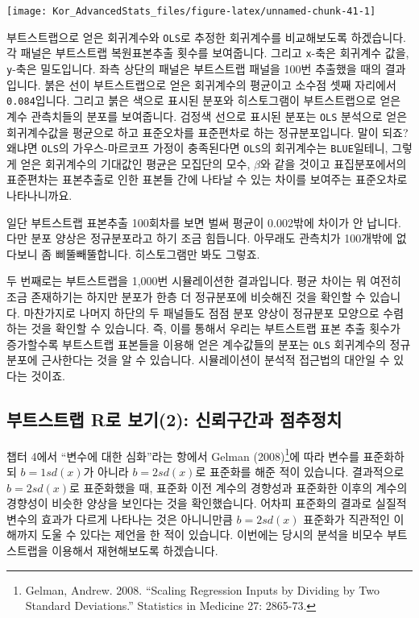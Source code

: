 \documentclass[
]{book}
\begin{document}
\begin{center}\texttt{[image: Kor\_AdvancedStats\_files/figure-latex/unnamed-chunk-41-1]} \end{center}

부트스트랩으로 얻은 회귀계수와 \texttt{OLS}로 추정한 회귀계수를 비교해보도록 하겠습니다. 각 패널은 부트스트랩 복원표본추출 횟수를 보여줍니다. 그리고 \texttt{x}-축은 회귀계수 값을, \texttt{y}-축은 밀도입니다. 좌측 상단의 패널은 부트스트랩 패널을 100번 추출했을 때의 결과입니다. 붉은 선이 부트스트랩으로 얻은 회귀계수의 평균이고 소수점 셋째 자리에서 \texttt{0.084}입니다. 그리고 붉은 색으로 표시된 분포와 히스토그램이 부트스트랩으로 얻은 계수 관측치들의 분포를 보여줍니다. 검정색 선으로 표시된 분포는 \texttt{OLS} 분석으로 얻은 회귀계수값을 평균으로 하고 표준오차를 표준편차로 하는 정규분포입니다. 말이 되죠? 왜냐면 \texttt{OLS}의 가우스-마르코프 가정이 충족된다면 \texttt{OLS}의 회귀계수는 \texttt{BLUE}일테니, 그렇게 얻은 회귀계수의 기대값인 평균은 모집단의 모수, \(\beta\)와 같을 것이고 표집분포에서의 표준편차는 표본추출로 인한 표본들 간에 나타날 수 있는 차이를 보여주는 표준오차로 나타나니까요.

일단 부트스트랩 표본추출 100회차를 보면 벌써 평균이 0.002밖에 차이가 안 납니다. 다만 분포 양상은 정규분포라고 하기 조금 힘듭니다. 아무래도 관측치가 100개밖에 없다보니 좀 삐뚤빼뚤합니다. 히스토그램만 봐도 그렇죠.

두 번째로는 부트스트랩을 1,000번 시뮬레이션한 결과입니다. 평균 차이는 뭐 여전히 조금 존재하기는 하지만 분포가 한층 더 정규분포에 비슷해진 것을 확인할 수 있습니다. 마찬가지로 나머지 하단의 두 패널들도 점점 분포 양상이 정규분포 모양으로 수렴하는 것을 확인할 수 있습니다. 즉, 이를 통해서 우리는 부트스트랩 표본 추출 횟수가 증가할수록 부트스트랩 표본들을 이용해 얻은 계수값들의 분포는 \texttt{OLS} 회귀계수의 정규분포에 근사한다는 것을 알 수 있습니다. 시뮬레이션이 분석적 접근법의 대안일 수 있다는 것이죠.

\hypertarget{uxbd80uxd2b8uxc2a4uxd2b8uxb7a9-ruxb85c-uxbcf4uxae302-uxc2e0uxb8b0uxad6cuxac04uxacfc-uxc810uxcd94uxc815uxce58}{%
\subsection{부트스트랩 R로 보기(2): 신뢰구간과 점추정치}\label{uxbd80uxd2b8uxc2a4uxd2b8uxb7a9-ruxb85c-uxbcf4uxae302-uxc2e0uxb8b0uxad6cuxac04uxacfc-uxc810uxcd94uxc815uxce58}}

챕터 4에서 ``변수에 대한 심화''라는 항에서 Gelman (2008)\footnote{Gelman, Andrew. 2008. ``Scaling Regression Inputs by Dividing by Two Standard Deviations.'' Statistics in Medicine 27: 2865-73.}에 따라 변수를 표준화하되 \(b=1sd(x)\)가 아니라 \(b=2sd(x)\)로 표준화를 해준 적이 있습니다. 결과적으로 \(b=2sd(x)\)로 표준화했을 때, 표준화 이전 계수의 경향성과 표준화한 이후의 계수의 경향성이 비슷한 양상을 보인다는 것을 확인했습니다. 어차피 표준화의 결과로 실질적 변수의 효과가 다르게 나타나는 것은 아니니만큼 \(b=2sd(x)\) 표준화가 직관적인 이해까지 도울 수 있다는 제언을 한 적이 있습니다.
이번에는 당시의 분석을 비모수 부트스트랩을 이용해서 재현해보도록 하겠습니다.
\end{document}
